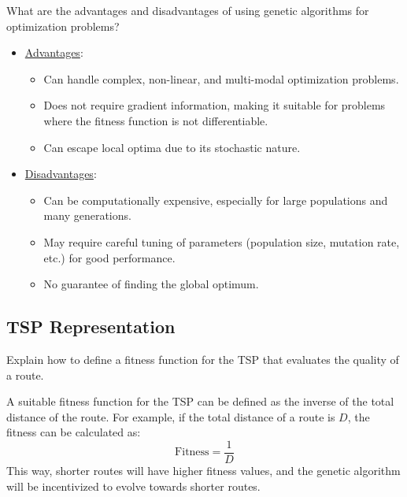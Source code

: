 \begin{ejercicio}
    What are the advantages and disadvantages of using genetic algorithms for optimization problems?
    \begin{itemize}
        \item \ul{Advantages}:
        \begin{itemize}
            \item Can handle complex, non-linear, and multi-modal optimization problems.
            \item Does not require gradient information, making it suitable for problems where the fitness function is not differentiable.
            \item Can escape local optima due to its stochastic nature.
        \end{itemize}
        \item \ul{Disadvantages}:
        \begin{itemize}
            \item Can be computationally expensive, especially for large populations and many generations.
            \item May require careful tuning of parameters (population size, mutation rate, etc.) for good performance.
            \item No guarantee of finding the global optimum.
        \end{itemize}
    \end{itemize}
\end{ejercicio}

\subsection*{TSP Representation}
\begin{ejercicio}
    Explain how to define a fitness function for the TSP that evaluates the quality of a route.

    A suitable fitness function for the TSP can be defined as the inverse of the total distance of the route. For example, if the total distance of a route is \(D\), the fitness can be calculated as:
    \[\text{Fitness} = \frac{1}{D}
    \]
    This way, shorter routes will have higher fitness values, and the genetic algorithm will be incentivized to evolve towards shorter routes.
\end{ejercicio}

